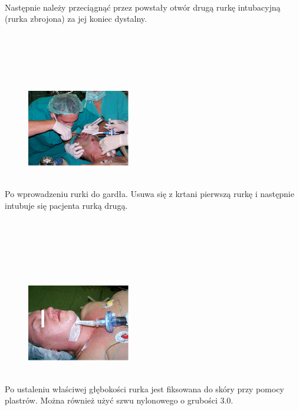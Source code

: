 \documentclass[a4paper, 12pt]{report}
\begin{document}
\hfill\\
Następnie należy przeciągnąć przez powstały otwór drugą rurkę
intubacyjną (rurka zbrojona) za jej koniec dystalny.
\hfill\\
\hfill\\
\hfill\\
\hfill\\
\hfill\\
\hfill\\

\begin{figure}
\includegraphics[width=0.4\textwidth]{images/itp4}
\end{figure}

\hfill\\
Po wprowadzeniu rurki do gardła. Usuwa się z krtani pierwszą rurkę i
następnie intubuje się pacjenta rurką drugą.

\newpage
\hfill\\
\hfill\\
\hfill\\
\hfill\\
\hfill\\

\begin{figure}
\includegraphics[width=0.4\textwidth]{images/itp5}
\end{figure}

\hfill\\
Po ustaleniu właściwej głębokości rurka jest fiksowana do skóry przy
pomocy plastrów. Można również użyć szwu nylonowego o grubości 3.0.

\hfill\\
\hfill\\
\hfill\\
\hfill\\
\hfill\\
\end{document}
